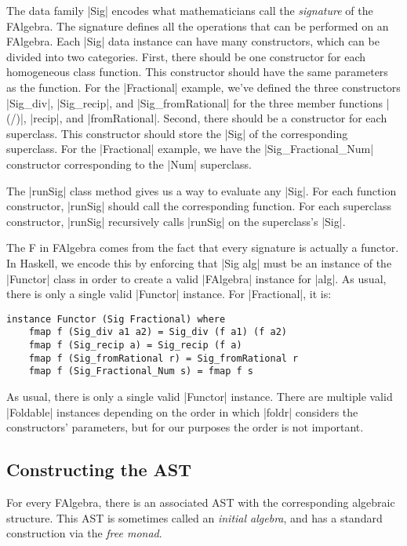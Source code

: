 \documentclass[preprint]{sigplanconf}
\theoremstyle{definition}
\begin{document}
The data family |Sig| encodes what mathematicians call the \emph{signature} of the FAlgebra.
The signature defines all the operations that can be performed on an FAlgebra.
Each |Sig| data instance can have many constructors,
which can be divided into two categories.
First, there should be one constructor for each homogeneous class function.
This constructor should have the same parameters as the function.
For the |Fractional| example, we've defined the three constructors |Sig_div|, |Sig_recip|, and |Sig_fromRational| for the three member functions |(/)|, |recip|, and |fromRational|.
Second, there should be a constructor for each superclass.
This constructor should store the |Sig| of the corresponding superclass.
For the |Fractional| example, we have the |Sig_Fractional_Num| constructor corresponding to the |Num| superclass.

The |runSig| class method gives us a way to evaluate any |Sig|.
For each function constructor, |runSig| should call the corresponding function.
For each superclass constructor, |runSig| recursively calls |runSig| on the superclass's |Sig|.

The F in FAlgebra comes from the fact that every signature is actually a functor.
In Haskell, we encode this by enforcing that |Sig alg| must be an instance of the |Functor| class in order to create a valid |FAlgebra| instance for |alg|.
As usual, there is only a single valid |Functor| instance.
For |Fractional|, it is:

\begin{lstlisting}
instance Functor (Sig Fractional) where
    fmap f (Sig_div a1 a2) = Sig_div (f a1) (f a2)
    fmap f (Sig_recip a) = Sig_recip (f a)
    fmap f (Sig_fromRational r) = Sig_fromRational r
    fmap f (Sig_Fractional_Num s) = fmap f s
\end{lstlisting}
As usual, there is only a single valid |Functor| instance.
There are multiple valid |Foldable| instances depending on the order in which |foldr| considers the constructors' parameters,
but for our purposes the order is not important.

\subsection{Constructing the AST}

For every FAlgebra, there is an associated AST with the corresponding algebraic structure.
This AST is sometimes called an \emph{initial algebra},
and has a standard construction via the \emph{free monad}.
\end{document}
